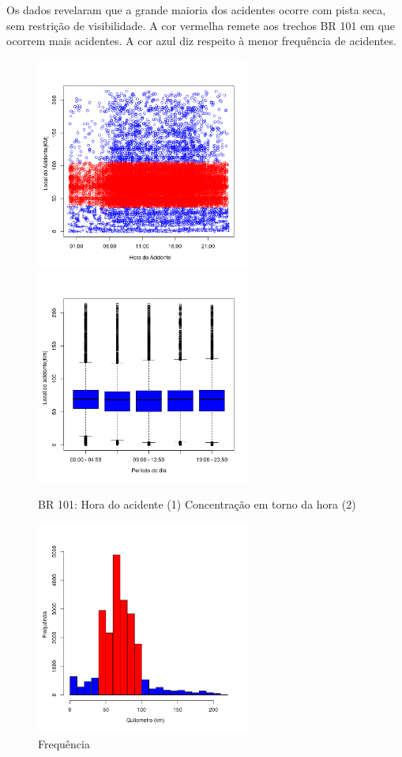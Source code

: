 Os dados revelaram que a grande maioria dos acidentes ocorre com pista seca, sem restrição de visibilidade. 
A cor vermelha remete aos trechos BR 101 em que ocorrem mais acidentes. A cor azul diz respeito à menor frequência de acidentes.

\begin{figure}[h]
	\caption{BR 101: Hora do acidente (1) Concentração em torno da hora (2)}
	\includegraphics[width=7cm,height=7cm]{Figuras/Preprocess/br101.png}
	\includegraphics[width=7cm,height=7cm]{Figuras/Preprocess/br101_2.png}
	
\end{figure}

\quad \quad
\begin{figure}[h]
	\centering
	\caption{ Frequência}
	\includegraphics[width=7cm,height=7cm]{Figuras/Preprocess/br101_4.png}
\end{figure}

